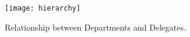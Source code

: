 \begin{figure}[htb]
    \centering
    \texttt{[image: hierarchy]}
    \caption{Relationship between Departments and Delegates.}
    \label{fig:hierarchy}
\end{figure}